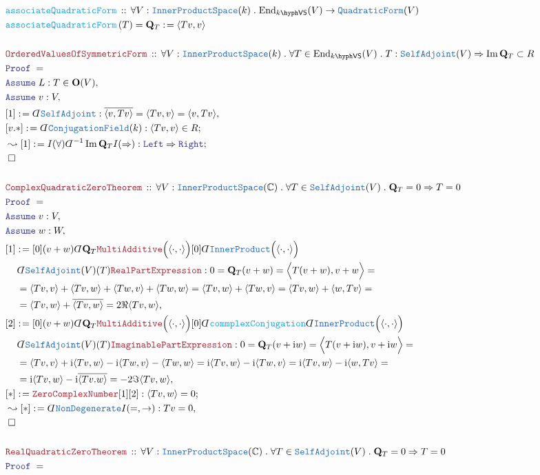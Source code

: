 \documentclass[12pt]{scrartcl}%
\newcommand{\TYPE}[1]{\textcolor{NavyBlue}{\mathtt{#1}}}%
\newcommand{\FUNC}[1]{\textcolor{Cerulean}{\mathtt{#1}}}%
\newcommand{\LOGIC}[1]{\textcolor{Blue}{\mathtt{#1}}}%
\newcommand{\THM}[1]{\textcolor{Maroon}{\mathtt{#1}}}%
\renewcommand{\.}{\; . \;} %
\newcommand{\de}{: \kern 0.1pc =} %
\newcommand{\Act}[1]{\left( #1 \right)} %
\newcommand{\Theorem}[2]{& \THM{#1} \, :: \, #2 \\ & \Proof = \\ } %
\newcommand{\DeclareFunc}[2]{& \FUNC{#1} \, :: \, #2 \\}%
\newcommand{\DefineNamedFunc}[4]{&  \FUNC{#1}\Act{#2} = #3 \de #4 \\}%
\newcommand{\NewLine}{\\ & \kern 1pc}%
\newcommand{\Page}[1]{ \begin{align*} #1 \end{align*}  }%
\newcommand{ \bd }{ \ByDef }%
\newcommand{\Complex}{\mathbb{C}}%
\DeclareMathOperator*{\im}{Im}%
\newcommand{\End}{\mathrm{End}}%
\newcommand{\Say}[3]{& #1 \de #2 : #3, \\} %
\newcommand{\Conclude}[3]{& #1 \de #2 : #3; \\}%
\newcommand{\Derive}[3]{& \leadsto #1 \de #2 : #3, \\} %
\newcommand{\DeriveConclude}[3]{& \leadsto #1 \de #2 : #3 ; \\} %
\newcommand{\Assume}[2]{& \LOGIC{Assume} \; #1 : #2, \\} %
\newcommand{\QED}{\; \square} %
\newcommand{\EndProof}{& \QED \\} %
\newcommand{\ByDef}{\rotatebox[origin=c]{-180}{$D$}}%
\newcommand{\Proof}{\LOGIC{Proof} \; } %
\newcommand{\IPS}{\TYPE{InnerProductSpace}}
\newcommand{\SA}{\TYPE{SelfAdjoint}}
\newcommand{\VS}[1]{#1\hyph\mathsf{VS}} %
\renewcommand{\O}{\mathbf{O}}
\begin{document}
\Page{
	\DeclareFunc{associateQuadraticForm}{\forall V : \IPS(k) \. \End_{\VS{k}}(V) \to \TYPE{QuadraticForm}(V)}
	\DefineNamedFunc{associateQuadraticForm}{T}{\mathbf{Q}_T}{\langle Tv, v \rangle}
	\\
	\Theorem{OrderedValuesOfSymmetricForm}{\forall V : \IPS(k) \. \forall T \in \End_{\VS{k}}(V) \. T : \SA(V) \Rightarrow \im \mathbf{Q}_T \subset R }
	\Assume{L}{T \in \O(V)}
	\Assume{v}{V}
	\Say{[1]}{\bd \SA}{  \overline{\langle v, Tv \rangle} = \langle Tv, v \rangle = \langle v, Tv \rangle }
	\Conclude{[v.*]}{ \bd \TYPE{ConjugationField}(k)}{  \langle Tv, v \rangle \in R   }
	\DeriveConclude{[1]}{I(\forall)\bd^{-1} \im \mathbf{Q}_T I(\Rightarrow)}{ \LOGIC{Left} \Rightarrow \LOGIC{Right} }
	\EndProof
	\\
	\Theorem{ComplexQuadraticZeroTheorem}{\forall V : \IPS(\Complex) \. \forall T \in \SA(V) \. \mathbf{Q}_T = 0 \Rightarrow T = 0 }
	\Assume{v}{V}
	\Assume{w}{W}
	\Say{[1]}{[0](v+w)\bd \mathbf{Q}_T \THM{MultiAdditive}\Big(  \langle \cdot,\cdot \rangle \Big)[0] 
		\bd \TYPE{InnerProduct}\Big(\langle \cdot , \cdot \rangle\Big) \NewLine \bd \SA(V)(T)\THM{RealPartExpression} }{   
		0 =
		\mathbf{Q}_T(v + w) =
		\Big\langle  T(v + w), v + w \Big\rangle = \NewLine =  
		\langle Tv,v \rangle + \langle Tv , w \rangle + \langle Tw, v \rangle + \langle Tw,w \rangle =
		\langle Tv,w \rangle + \langle Tw,v \rangle = 
		\langle Tv, w \rangle + \langle w,Tv \rangle = \NewLine = 
		\langle Tv,w \rangle + \overline{\langle Tv, w\rangle} =
		2\Re\langle Tv,w \rangle
	}
	\Say{[2]}{[0](v+w)\bd \mathbf{Q}_T \THM{MultiAdditive}\Big(  \langle \cdot,\cdot \rangle \Big)[0]\bd \FUNC{commplexConjugation} 
		\bd \TYPE{InnerProduct}\Big(\langle \cdot , \cdot \rangle\Big)\NewLine\bd \SA(V)(T)\THM{ImaginablePartExpression} }{   
		0 =
		\mathbf{Q}_T(v + \mathrm{i}w) =
		\Big\langle  T(v + \mathrm{i}w), v + \mathrm{i}w \Big\rangle = \NewLine =  
		\langle Tv,v \rangle + \mathrm{i}\langle Tv , w \rangle  - \mathrm{i} \langle Tw, v \rangle  - \langle Tw,w \rangle =
		\mathrm{i}\langle Tv,w \rangle - \mathrm{i}\langle Tw,v \rangle = 
		\mathrm{i}\langle Tv, w \rangle - \mathrm{i}\langle w,Tv \rangle = \NewLine = 
		\mathrm{i}\langle Tv,w \rangle - \mathrm{i}\overline{\langle Tv. w\rangle} =
		-2\Im\langle Tv,w \rangle
	}
	\Conclude{[*]}{\THM{ZeroComplexNumber}[1][2]}{ \langle Tv, w \rangle = 0  } 
	\Derive{[*]}{\bd \TYPE{NonDegenerate}I(=,\to)}{ Tv = 0  }
	\EndProof
	\\
	\Theorem{RealQuadraticZeroTheorem}{\forall V : \IPS(\Complex) \. \forall T \in \SA(V) \. \mathbf{Q}_T = 0 \Rightarrow T = 0 }
}
\end{document}
